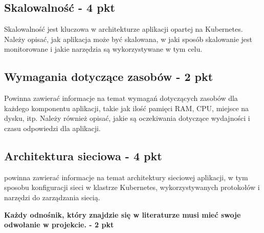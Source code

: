 \documentclass[12pt,a4paper]{article}
\begin{document}
\subsection{Skalowalność - 4 pkt}
\label{sec:ExamplesSection}

Skalowalność jest kluczowa w architekturze aplikacji opartej na Kubernetes. Należy opisać, jak aplikacja może być skalowana, w jaki sposób skalowanie jest monitorowane i jakie narzędzia są wykorzystywane w tym celu.

\subsection{Wymagania dotyczące zasobów - 2 pkt}
\label{sec:ExampleTables}

Powinna zawierać informacje na temat wymagań dotyczących zasobów dla każdego komponentu aplikacji, takie jak ilość pamięci RAM, CPU, miejsce na dysku, itp. Należy również opisać, jakie są oczekiwania dotyczące wydajności i czasu odpowiedzi dla aplikacji.


\subsection{Architektura sieciowa - 4 pkt}
\label{sec:ExampleResults}

powinna zawierać informacje na temat architektury sieciowej aplikacji, w tym sposobu konfiguracji sieci w klastrze Kubernetes, wykorzystywanych protokołów i narzędzi do zarządzania siecią.

\noindent
\textbf{Każdy odnośnik, który znajdzie się w literaturze musi mieć swoje odwołanie w projekcie. - 2 pkt} 



\nocite{*}
\end{document}
